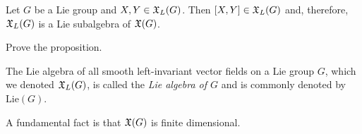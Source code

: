 
\begin{proposition}
  Let $G$ be a Lie group and $X,Y\in\mathfrak{X}_L(G)$.
  Then $[X,Y]\in\mathfrak{X}_L(G)$ and, therefore, $\mathfrak{X}_L(G)$ is a Lie subalgebra of $\mathfrak{X}(G)$.
\end{proposition}
\begin{exercise}
  Prove the proposition.
\end{exercise}

\begin{remark}
  The Lie algebra of all smooth left-invariant vector fields on a Lie group $G$, which we denoted $\mathfrak{X}_L(G)$, is called the \emph{Lie algebra of $G$} and is commonly denoted by $\mathrm{Lie}(G)$.
\end{remark}

A fundamental fact is that $\mathfrak{X}(G)$ is finite dimensional.

